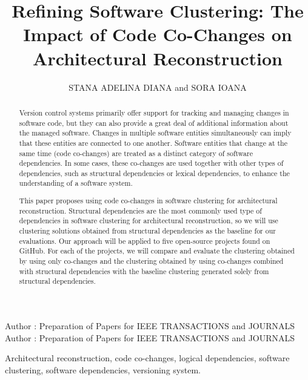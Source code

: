 \documentclass{ieeeaccess}
\begin{document}

\title{Refining Software Clustering: The Impact of Code Co-Changes on Architectural Reconstruction}
\author{\uppercase{Stana Adelina Diana} and
\uppercase{Sora Ioana}
}

\address[1]{Computer Science and Engineering Department
”Politehnica” University of Timisoara, Romania (e-mail: stana.adelina.diana@gmail.com)}
\address[2]{Computer Science and Engineering Department
”Politehnica” University of Timisoara, Romania (e-mail: ioana.sora@cs.upt.ro)}

\markboth
{Author \headeretal: Preparation of Papers for IEEE TRANSACTIONS and JOURNALS}
{Author \headeretal: Preparation of Papers for IEEE TRANSACTIONS and JOURNALS}



\begin{abstract}
Version control systems primarily offer support for tracking and managing changes in software code, but they can also provide a great deal of additional information about the managed software. Changes in multiple software entities simultaneously can imply that these entities are connected to one another. Software entities that change at the same time (code co-changes) are treated as a distinct category of software dependencies. In some cases, these co-changes are used together with other types of dependencies, such as structural dependencies or lexical dependencies, to enhance the understanding of a software system.


This paper proposes using code co-changes in software clustering for architectural reconstruction. Structural dependencies are the most commonly used type of dependencies in software clustering for architectural reconstruction, so we will use clustering solutions obtained from structural dependencies as the baseline for our evaluations. Our approach will be applied to five open-source projects found on GitHub. For each of the projects, we will compare and evaluate the clustering obtained by using only co-changes and the clustering obtained by using co-changes combined with structural dependencies with the baseline clustering generated solely from structural dependencies.
\end{abstract}

\begin{keywords}
Architectural reconstruction, code co-changes, logical dependencies, software clustering, software dependencies, versioning system.
\end{keywords}
\end{document}
